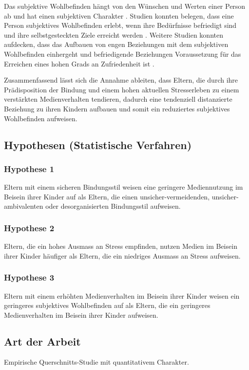 Das subjektive Wohlbefinden hängt von den Wünschen und Werten einer Person ab und hat einen subjektiven Charakter \cite{Odaci2014}. Studien konnten belegen, dass eine Person subjektives Wohlbefinden erlebt, wenn ihre Bedürfnisse befriedigt sind und ihre selbstgesteckten Ziele erreicht werden \cite{Diener1999}. Weitere Studien konnten aufdecken, dass das Aufbauen von engen Beziehungen mit dem subjektiven Wohlbefinden einhergeht \cite{Kasser1996} und befriedigende Beziehungen Voraussetzung für das Erreichen eines hohen Grads an Zufriedenheit ist \cite{Celik2013}.

Zusammenfassend lässt sich die Annahme ableiten, dass Eltern, die durch ihre Prädisposition der Bindung und einem hohen aktuellen Stresserleben zu einem verstärkten Medienverhalten tendieren, dadurch eine tendenziell distanzierte Beziehung zu ihren Kindern aufbauen und somit ein reduziertes subjektives Wohlbefinden aufweisen.

\subsection{Hypothesen (Statistische Verfahren)}
\subsubsection{Hypothese 1}
Eltern mit einem sicheren Bindungsstil weisen eine geringere Mediennutzung im Beisein ihrer Kinder auf als Eltern, die einen unsicher-vermeidenden, unsicher-ambivalenten oder desorganisierten Bindungsstil aufweisen.
\subsubsection{Hypothese 2}
Eltern, die ein hohes Ausmass an Stress empfinden, nutzen Medien im Beisein ihrer Kinder häufiger als Eltern, die ein niedriges Ausmass an Stress aufweisen.
\subsubsection{Hypothese 3}
Eltern mit einem erhöhten Medienverhalten im Beisein ihrer Kinder weisen ein geringeres subjektives Wohlbefinden auf als Eltern, die ein geringeres Medienverhalten im Beisein ihrer Kinder aufweisen.
\subsection{Art der Arbeit}
Empirische Querschnitts-Studie mit quantitativem Charakter.

